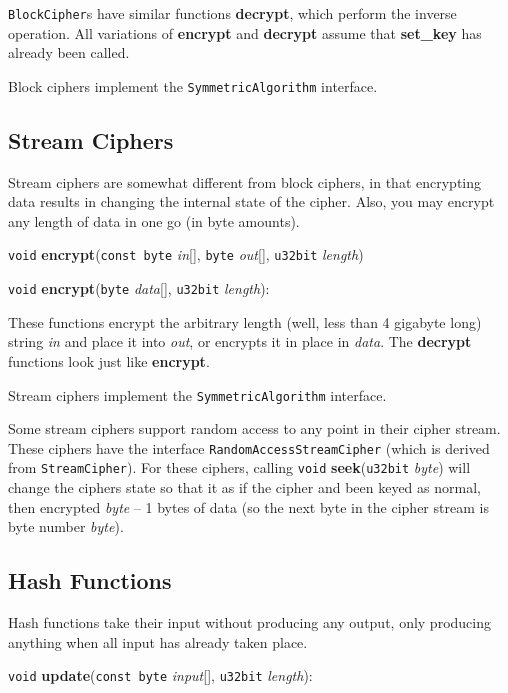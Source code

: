 \documentclass{article}
\newcommand{\function}[1]{\textbf{#1}}
\newcommand{\type}[1]{\texttt{#1}}
\renewcommand{\arg}[1]{\textsl{#1}}
\begin{document}
\type{BlockCipher}s have similar functions \function{decrypt}, which perform
the inverse operation. All variations of \function{encrypt} and
\function{decrypt} assume that \function{set\_key} has already been called.

Block ciphers implement the \type{SymmetricAlgorithm} interface.

\subsection{Stream Ciphers}

Stream ciphers are somewhat different from block ciphers, in that encrypting
data results in changing the internal state of the cipher. Also, you may
encrypt any length of data in one go (in byte amounts).

\vskip 10pt \noindent
\type{void} \function{encrypt}(\type{const byte} \arg{in}[], \type{byte}
\arg{out}[], \type{u32bit} \arg{length})

\noindent
\type{void} \function{encrypt}(\type{byte} \arg{data}[], \type{u32bit}
\arg{length}):

\vskip 5pt

These functions encrypt the arbitrary length (well, less than 4 gigabyte long)
string \arg{in} and place it into \arg{out}, or encrypts it in place in
\arg{data}.  The \function{decrypt} functions look just like
\function{encrypt}.

Stream ciphers implement the \type{SymmetricAlgorithm} interface.

Some stream ciphers support random access to any point in their cipher stream.
These ciphers have the interface \type{RandomAccessStreamCipher} (which is
derived from \type{StreamCipher}). For these ciphers, calling \type{void}
\function{seek}(\type{u32bit} \arg{byte}) will change the ciphers state so that
it as if the cipher and been keyed as normal, then encrypted \arg{byte} -- 1
bytes of data (so the next byte in the cipher stream is byte number
\arg{byte}).

\subsection{Hash Functions}

Hash functions take their input without producing any output, only producing
anything when all input has already taken place.

\vskip 10pt \noindent
\type{void} \function{update}(\type{const byte} \arg{input}[], \type{u32bit}
\arg{length}):
\end{document}
